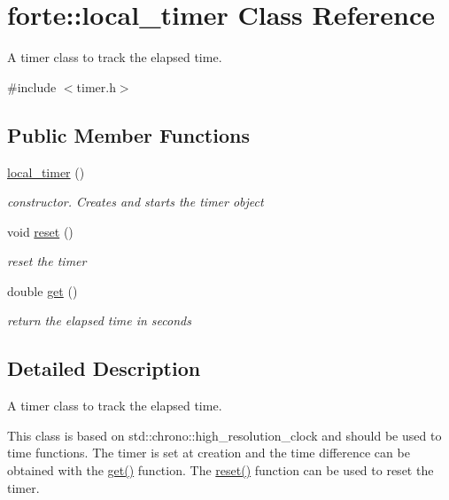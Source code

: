 \hypertarget{classforte_1_1local__timer}{}\section{forte\+:\+:local\+\_\+timer Class Reference}
\label{classforte_1_1local__timer}


A timer class to track the elapsed time.  




{\ttfamily \#include $<$timer.\+h$>$}

\subsection*{Public Member Functions}
\begin{DoxyCompactItemize}
\item 
\mbox{\hyperlink{classforte_1_1local__timer_a7f1670230b2c1b039cd42e9759f4c503}{local\+\_\+timer}} ()
\begin{DoxyCompactList}\small\item\em constructor. Creates and starts the timer object \end{DoxyCompactList}\item 
void \mbox{\hyperlink{classforte_1_1local__timer_a0e2798a0b31670ec6c47a1b2ce9604f5}{reset}} ()
\begin{DoxyCompactList}\small\item\em reset the timer \end{DoxyCompactList}\item 
double \mbox{\hyperlink{classforte_1_1local__timer_a52875539e4e05be2b34cca7717ee09ce}{get}} ()
\begin{DoxyCompactList}\small\item\em return the elapsed time in seconds \end{DoxyCompactList}\end{DoxyCompactItemize}


\subsection{Detailed Description}
A timer class to track the elapsed time. 

This class is based on std\+::chrono\+::high\+\_\+resolution\+\_\+clock and should be used to time functions. The timer is set at creation and the time difference can be obtained with the \mbox{\hyperlink{classforte_1_1local__timer_a52875539e4e05be2b34cca7717ee09ce}{get()}} function. The \mbox{\hyperlink{classforte_1_1local__timer_a0e2798a0b31670ec6c47a1b2ce9604f5}{reset()}} function can be used to reset the timer. 

